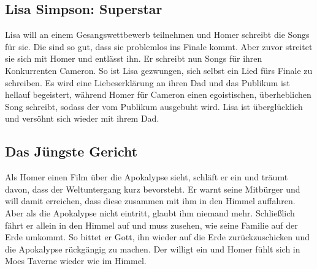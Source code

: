 
\subsection{Lisa Simpson: Superstar}\label{GABF13}
Lisa will an einem Gesangswettbewerb teilnehmen und Homer schreibt die Songs für sie. Die sind so gut, dass sie problemlos ins Finale kommt. Aber zuvor streitet sie sich mit Homer und entlässt ihn. Er schreibt nun Songs für ihren Konkurrenten Cameron. So ist Lisa gezwungen, sich selbst ein Lied fürs Finale zu schreiben. Es wird eine Liebeserklärung an ihren Dad und das Publikum ist hellauf begeistert, während Homer für Cameron einen egoistischen, überheblichen Song schreibt, sodass der vom Publikum ausgebuht wird. Lisa ist überglücklich und versöhnt sich wieder mit ihrem Dad.


\subsection{Das Jüngste Gericht}
Als Homer einen Film über die Apokalypse sieht, schläft er ein und träumt davon, dass der Weltuntergang kurz bevorsteht. Er warnt seine Mitbürger und will damit erreichen, dass diese zusammen mit ihm in den Himmel auffahren. Aber als die Apokalypse nicht eintritt, glaubt ihm niemand mehr. Schließlich fährt er allein in den Himmel auf und muss zusehen, wie seine Familie auf der Erde umkommt. So bittet er Gott, ihn wieder auf die Erde zurückzuschicken und die Apokalypse rückgängig zu machen. Der willigt ein und Homer fühlt sich in Moes Taverne wieder wie im Himmel.

